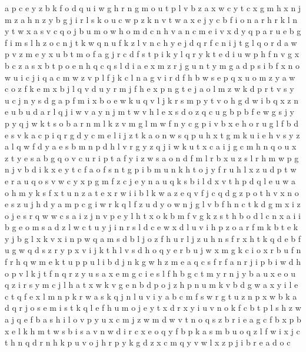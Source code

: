 \documentclass{article}
\begin{document}
a p c e y z b k f o d q u i w g h r n
g m o u t p l v b z a x w c y
t c x g m
h x n j m z
a h n z y b g j i r l s k o u c w
p z k n v t w a x e
j y c b f i o n a r h
r k
l n y t w x a s v c q o j b u
m o w
h o m d c n
h v a n c m e i
v x d y q p a r u e b g f i m s l h z o c n j t k w
q n u f
k z l v n c h y e j d q r
f c n i j t g l q o r d a w p v z m e y x
u b t m o f a g
j r c d f s t p i k y
l q r y k t e d i u w p h f n v g x b c z a s
x b t p o e n h q
c q s l d i a e x m z r j g u n t
y m g a d p s i b f x n o w u
i c j
i q a c m w z v p l f j
k c l n a g v i r d f h b w s e p q x u o m z y
a w c o z f k e m x b j l q v d u y r
m j f h e x p n g t
e j a o l m z w k d p r t v s y u c
j n y s d g a p f m i x b o e w k u q v l
j k r s m p y t v o h g d w i b q x z n e u
b u d a r l q j i w v
a y n j m t w v h l e x s d o z q c u g b p
b f e w g s j y p
y q j w k t s o b a r n m l
k z v m g l
m w f n y c g p i v b x e h
o r u g l f b d e s v k a c p i q
r g d y c m e l i j z t k a o n w s q p u h x
t g m k u i e h v s y z a l q w f d
y a
e s b m n p d h l v r g y z q j i w k u t x c a
i
j g c m h n q o u x z t y e s a b
g q o v c u r i p t a f
y i z w s a o n d f m l r b x
u z s l r h m w p g n j v b d i k x e y t c f a o
f s n t g p i b m u
n k h t o j y f r
u h
l x z u d p t w e
r
a u q o s v w c y x p
g m f z c j e y n a u q k s b i l d x v t h p
d q l e u w a o h m y k s f x t
u n z a t e x r w i
i b l k w a z e q v f j
c q d g z
p o t h
v x n o e s z u j h d y a m p c g i w r k q l f
z u d
y o w n j g l
v b f h n c t k d g m x i z o j e s r q w
w c s a i z j n v p e y l h t x o k b m
f v g k z s t h b o d l c n x a i
i b g e o m s a d z l w c t u y j
i n r s l d c e
w x d l u v i h p z o a r f m k b t e
k y
j b g l x k v
x i n p w q a m s d b l j o z f h u r
l j z u h n
s f r x h t k q d e
b f u g w q d s z r y p x v i j k t h l
v s d h o q y e r b u j w x m g k
c i o x r b u f n
f r h q w m e k t u p
p u l i b d j n k g w h z m e a q c s f r
f a n r j i p
b i w d h o p v l k j t f n q r z y u s a x e m g c
i e s l f h b g c t m y r
n j y b a u x e
o u q z i r s y m c j l h a t x w k v g e n b d p
o j z h p n u m k v b d g w a x y i l e c t q f
e x l m n p k r w a s
k q j n l u v i y a b c m f s w r
g t u z n p x w b k a d q r j o s e m
i s t k q l
e f h
u m o j e y t x
d r x y i u v n o k f c b t p l s h z w a j q e
f b a s h i l o v p y u x c m j z w
m d w v t n o q s z b r i e a g c f
b x p
b x e l k h m t w s
b i s
a v n w d i r c x e o q y f b
p k a s m b u o q z l f w i x j c t h n
q d r n h k p
u v o j h r p y k g d z x c
m q y v w l x z p j i b r e a d o c
\end{document}
